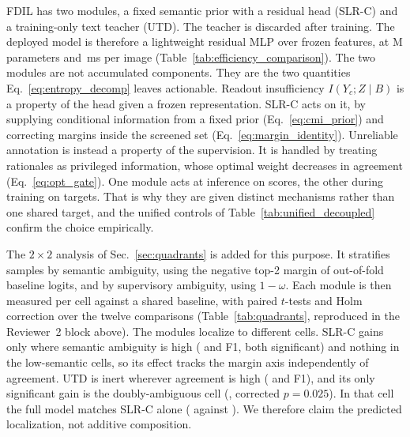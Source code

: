 {

 FDIL has two modules, a fixed semantic prior with a residual head (SLR-C) and a training-only text teacher (UTD). The teacher is discarded after training. The deployed model is therefore a lightweight residual MLP over frozen features, at M parameters and \,ms per image (Table~\ref{tab:efficiency_comparison}). The two modules are not accumulated components. They are the two quantities Eq.~\eqref{eq:entropy_decomp} leaves actionable. Readout insufficiency $I(Y_c;Z\mid B)$ is a property of the head given a frozen representation. SLR-C acts on it, by supplying conditional information from a fixed prior (Eq.~\eqref{eq:cmi_prior}) and correcting margins inside the screened set (Eq.~\eqref{eq:margin_identity}). Unreliable annotation is instead a property of the supervision. It is handled by treating rationales as privileged information, whose optimal weight decreases in agreement (Eq.~\eqref{eq:opt_gate}). One module acts at inference on scores, the other during training on targets. That is why they are given distinct mechanisms rather than one shared target, and the unified controls of Table~\ref{tab:unified_decoupled} confirm the choice empirically.

 The $2\times2$ analysis of Sec.~\ref{sec:quadrants} is added for this purpose. It stratifies samples by semantic ambiguity, using the negative top-2 margin of out-of-fold baseline logits, and by supervisory ambiguity, using $1-\omega$. Each module is then measured per cell against a shared baseline, with paired $t$-tests and Holm correction over the twelve comparisons (Table~\ref{tab:quadrants}, reproduced in the Reviewer~2 block above). The modules localize to different cells. SLR-C gains only where semantic ambiguity is high ( and  F1, both significant) and nothing in the low-semantic cells, so its effect tracks the margin axis independently of agreement. UTD is inert wherever agreement is high ( and  F1), and its only significant gain is the doubly-ambiguous cell (, corrected $p=0.025$). In that cell the full model matches SLR-C alone ( against ). We therefore claim the predicted localization, not additive composition.

}
